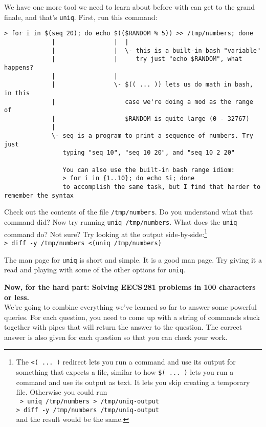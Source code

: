 \documentclass{article}
\begin{document}
\newpage
\noindent
We have one more tool we need to learn about before with can get to the grand
finale, and that's \texttt{uniq}. First, run this command:
\begin{lstlisting}[keepspaces=true]
> for i in $(seq 20); do echo $(($RANDOM % 5)) >> /tmp/numbers; done
             |                |  |
             |                |  \- this is a built-in bash "variable"
             |                |     try just "echo $RANDOM", what happens?
             |                |
             |                \- $(( ... )) lets us do math in bash, in this
             |                   case we're doing a mod as the range of
             |                   $RANDOM is quite large (0 - 32767)
             |
             \- seq is a program to print a sequence of numbers. Try just
                typing "seq 10", "seq 10 20", and "seq 10 2 20"

                You can also use the built-in bash range idiom:
                > for i in {1..10}; do echo $i; done
                to accomplish the same task, but I find that harder to remember the syntax
\end{lstlisting}
%
Check out the contents of the file \texttt{/tmp/numbers}. Do you understand
what that command did?
\medskip
\noindent
Now try running \texttt{uniq /tmp/numbers}. What does the \texttt{uniq}
command do? Not sure? Try looking at the output side-by-side:\footnote{
  The \texttt{<( ...\ )} redirect lets you run a command and use its output for
  something that expects a file, similar to how \texttt{\$( ...\ )} lets you
  run a command and use its output as text. It lets you skip creating a
  temporary file. Otherwise you could run\\\texttt{
  > uniq /tmp/numbers > /tmp/uniq-output\\
  > diff -y /tmp/numbers /tmp/uniq-output\\
  }
  and the result would be the same.
}\\
\texttt{> diff -y /tmp/numbers <(uniq /tmp/numbers)}

\medskip
\noindent
The man page for \texttt{uniq} is short and simple. It is a good man page. Try
giving it a read and playing with some of the other options for \texttt{uniq}.


\newpage
\medskip
\noindent
\textbf{\large Now, for the hard part: Solving EECS\,281 problems in 100 characters or less.}\\
We're going to combine everything we've learned so far to answer some powerful
queries. For each question, you need to come up with a string of commands
stuck together with pipes that will return the answer to the question. The
correct answer is also given for each question so that you can check your
work.
\end{document}
